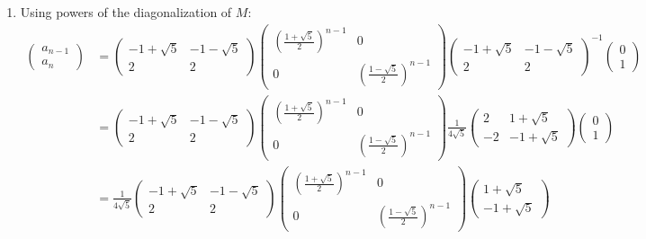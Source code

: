 \documentclass[12pt, a4paper]{article}
\begin{document}
\begin{enumerate}[Q\arabic*.]
\begin{enumerate}[(\alph*)]
    \item Using powers of the diagonalization of $M$:
      \begin{align*}
        \left(\begin{array}{c} a_{n-1}\\ a_n \end{array}\right) &= \left(\begin{array}{cc} -1+\sqrt{5} & -1-\sqrt{5}\\ 2 & 2\end{array}\right) \left(\begin{array}{cc} (\frac{1+\sqrt{5}}{2})^{n-1} & 0\\ 0 & (\frac{1-\sqrt{5}}{2})^{n-1}\end{array}\right)\left(\begin{array}{cc} -1+\sqrt{5} & -1-\sqrt{5}\\ 2 & 2\end{array}\right)^{-1}\left(\begin{array}{c} 0\\ 1 \end{array}\right)\\ 
                                                                &= \left(\begin{array}{cc} -1+\sqrt{5} & -1-\sqrt{5}\\ 2 & 2\end{array}\right) \left(\begin{array}{cc} (\frac{1+\sqrt{5}}{2})^{n-1} & 0\\ 0 & (\frac{1-\sqrt{5}}{2})^{n-1}\end{array}\right)\frac{1}{4\sqrt{5}} \left(\begin{array}{cc} 2 & 1+\sqrt{5}\\ -2 & -1+\sqrt{5}\end{array}\right)\left(\begin{array}{c} 0\\ 1 \end{array}\right)\\
                                                                &= \frac{1}{4\sqrt{5}}\left(\begin{array}{cc} -1+\sqrt{5} & -1-\sqrt{5}\\ 2 & 2\end{array}\right) \left(\begin{array}{cc} (\frac{1+\sqrt{5}}{2})^{n-1} & 0\\ 0 & (\frac{1-\sqrt{5}}{2})^{n-1}\end{array}\right)\left(\begin{array}{c} 1+\sqrt{5}\\ -1+\sqrt{5} \end{array}\right)\\

\end{align*}
\end{enumerate}
\end{enumerate}
\end{document}
